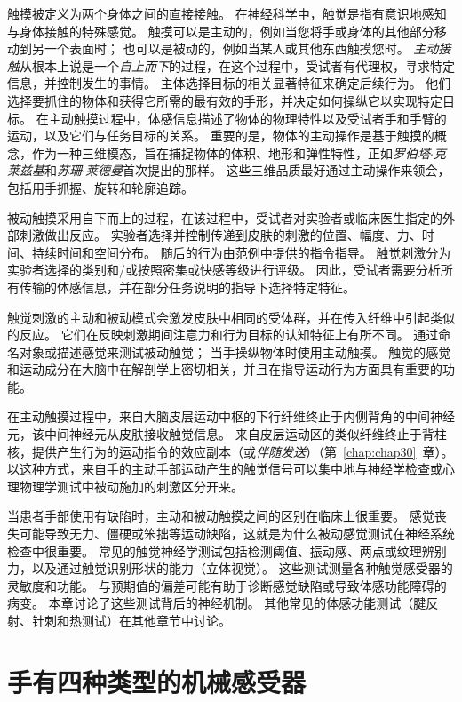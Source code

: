 触摸被定义为两个身体之间的直接接触。
在神经科学中，触觉是指有意识地感知与身体接触的特殊感觉。
触摸可以是主动的，例如当您将手或身体的其他部分移动到另一个表面时；
也可以是被动的，例如当某人或其他东西触摸您时。
\textit{主动接触}从根本上说是一个\textit{自上而下}的过程，在这个过程中，受试者有代理权，寻求特定信息，并控制发生的事情。
主体选择目标的相关显著特征来确定后续行为。
他们选择要抓住的物体和获得它所需的最有效的手形，并决定如何操纵它以实现特定目标。
在主动触摸过程中，体感信息描述了物体的物理特性以及受试者手和手臂的运动，以及它们与任务目标的关系。
重要的是，物体的主动操作是基于触摸的概念，作为一种三维模态，旨在捕捉物体的体积、地形和弹性特性，正如\textit{罗伯塔$\cdot$克莱兹基}和\textit{苏珊$\cdot$莱德曼}首次提出的那样。
这些三维品质最好通过主动操作来领会，包括用手抓握、旋转和轮廓追踪。


被动触摸采用自下而上的过程，在该过程中，受试者对实验者或临床医生指定的外部刺激做出反应。
实验者选择并控制传递到皮肤的刺激的位置、幅度、力、时间、持续时间和空间分布。
随后的行为由范例中提供的指令指导。
触觉刺激分为实验者选择的类别和/或按照密集或快感等级进行评级。
因此，受试者需要分析所有传输的体感信息，并在部分任务说明的指导下选择特定特征。


触觉刺激的主动和被动模式会激发皮肤中相同的受体群，并在传入纤维中引起类似的反应。
它们在反映刺激期间注意力和行为目标的认知特征上有所不同。
通过命名对象或描述感觉来测试被动触觉；
当手操纵物体时使用主动触摸。
触觉的感觉和运动成分在大脑中在解剖学上密切相关，并且在指导运动行为方面具有重要的功能。


在主动触摸过程中，来自大脑皮层运动中枢的下行纤维终止于内侧背角的中间神经元，该中间神经元从皮肤接收触觉信息。
来自皮层运动区的类似纤维终止于背柱核，提供产生行为的运动指令的效应副本（或\textit{伴随发送}）（第~\ref{chap:chap30}~章）。
以这种方式，来自手的主动手部运动产生的触觉信号可以集中地与神经学检查或心理物理学测试中被动施加的刺激区分开来。


当患者手部使用有缺陷时，主动和被动触摸之间的区别在临床上很重要。
感觉丧失可能导致无力、僵硬或笨拙等运动缺陷，这就是为什么被动感觉测试在神经系统检查中很重要。
常见的触觉神经学测试包括检测阈值、振动感、两点或纹理辨别力，以及通过触觉识别形状的能力（立体视觉）。 
这些测试测量各种触觉感受器的灵敏度和功能。
与预期值的偏差可能有助于诊断感觉缺陷或导致体感功能障碍的病变。
本章讨论了这些测试背后的神经机制。
其他常见的体感功能测试（腱反射、针刺和热测试）在其他章节中讨论。



\section{手有四种类型的机械感受器}

